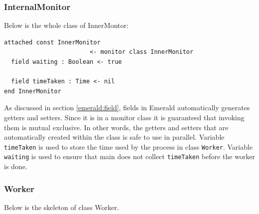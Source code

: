 \subsubsection{InternalMonitor}
Below is the whole class of InnerMontor:
\begin{lstlisting}[language=emerald]
attached const InnerMonitor 
                        <- monitor class InnerMonitor
  field waiting : Boolean <- true

  field timeTaken : Time <- nil
end InnerMonitor
\end{lstlisting}
As discussed in section \ref{emerald:field}, fields in Emerald automatically generates getters and setters. Since it is in a monitor class it is guaranteed that invoking them is mutual exclusive. In other words, the getters and setters that are automatically created within the class is safe to use in parallel. Variable \verb|timeTaken| is used to store the time used by the process in class \verb|Worker|. Variable \verb|waiting| is used to ensure that main does not collect \verb|timeTaken| before the worker is done. 





\subsubsection{Worker}
Below is the skeleton of class Worker.

